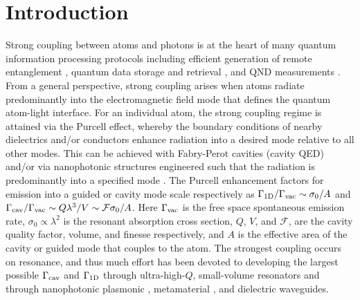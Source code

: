 \documentclass[aps,pra,twocolumn]{revtex4-1} %
\newcommand{\oneD}{{\rm 1D}}
\newcommand{\vac}{{\rm vac}}
\newcommand{\cav}{{\rm cav}}
\begin{document}
\maketitle

\section{Introduction}

Strong coupling between atoms and photons is at the heart of many quantum information processing protocols including efficient generation of remote entanglement \cite{duan_long-distance_2001, julsgaard_experimental_2001}, quantum data storage and retrieval \cite{ eisaman_electromagnetically_2005}, and QND measurements \cite{eckert_quantum_2008}.  
From a general perspective, strong coupling arises when atoms radiate predominantly into the electromagnetic field mode that defines the quantum atom-light interface.  
For an individual atom, the strong coupling regime is attained via the Purcell effect, whereby the boundary conditions of nearby dielectrics and/or conductors enhance radiation into a desired mode relative to all other modes.  
This can be achieved with Fabry-Perot cavities (cavity QED) \cite{miller_trapped_2005} and/or via nanophotonic structures engineered such that the radiation is predominantly into a specified mode \cite{manga_rao_single_2007, hakuta_manipulating_2012, hung_trapped_2013}.  The Purcell enhancement factors for emission into a guided or cavity mode scale respectively as  $ \Gamma_{\oneD}/\Gamma_{\vac} \sim \sigma_0/A$ and  $\Gamma_{\cav}/\Gamma_{\vac} \sim   Q \lambda^3/V \sim \mathcal{F}  \sigma_0/A$.  Here $\Gamma_{\vac}$ is the free space spontaneous emission rate, $\sigma_0 \propto \lambda^2$ is the resonant absorption cross section, $Q$, $V$, and $\mathcal{F}$,  are the cavity quality factor, volume, and finesse respectively, and $A$ is the effective area of the cavity or guided mode that couples to the atom.  The strongest coupling occurs on resonance, and thus much effort has been devoted to developing the largest possible $\Gamma_{\cav}$ and $\Gamma_{\oneD}$ through ultra-high-$Q$, small-volume resonators \cite{raimond_manipulating_2001, wallraff_strong_2004, miller_trapped_2005} and through nanophotonic plasmonic \cite{dzsotjan_quantum_2010, tame_quantum_2013}, metamaterial \cite{yao_ultrahigh_2009}, and dielectric \cite{hung_trapped_2013, goban_atomlight_2014} waveguides.   
\end{document}
